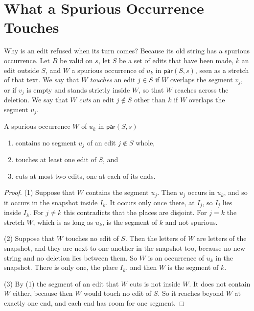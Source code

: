 \documentclass[acmsmall,nonacm,screen]{acmart}
\newcommand{\kw}[1]{\mathsf{#1}}
\newcommand{\Par}{\kw{par}}
\begin{document}
\section{What a Spurious Occurrence Touches}\label{sec:anatomy}

Why is an edit refused when its turn comes? Because its old string has a spurious occurrence.
Let $B$ be valid on $s$, let $S$ be a set of edits that have been made, $k$ an edit outside
$S$, and $W$ a spurious occurrence of $u_k$ in $\Par(S, s)$, seen as a stretch of that text.
We say that $W$ \emph{touches} an edit $j \in S$ if $W$ overlaps the segment $v_j$, or if
$v_j$ is empty and stands strictly inside $W$, so that $W$ reaches across the deletion. We
say that $W$ \emph{cuts} an edit $j \notin S$ other than $k$ if $W$ overlaps the segment
$u_j$.

\begin{lemma}[Anatomy]\label{lem:anatomy}
A spurious occurrence $W$ of $u_k$ in $\Par(S, s)$
\begin{enumerate}
\item contains no segment $u_j$ of an edit $j \notin S$ whole,
\item touches at least one edit of $S$, and
\item cuts at most two edits, one at each of its ends.
\end{enumerate}
\end{lemma}

\begin{proof}
(1) Suppose that $W$ contains the segment $u_j$. Then $u_j$ occurs in $u_k$, and so it occurs
in the snapshot inside $I_k$. It occurs only once there, at $I_j$, so $I_j$ lies inside
$I_k$. For $j \ne k$ this contradicts that the places are disjoint. For $j = k$ the stretch
$W$, which is as long as $u_k$, is the segment of $k$ and not spurious.

(2) Suppose that $W$ touches no edit of $S$. Then the letters of $W$ are letters of the
snapshot, and they are next to one another in the snapshot too, because no new string and no
deletion lies between them. So $W$ is an occurrence of $u_k$ in the snapshot. There is only
one, the place $I_k$, and then $W$ is the segment of $k$.

(3) By (1) the segment of an edit that $W$ cuts is not inside $W$. It does not contain $W$
either, because then $W$ would touch no edit of $S$. So it reaches beyond $W$ at exactly one
end, and each end has room for one segment.
\end{proof}
\end{document}

